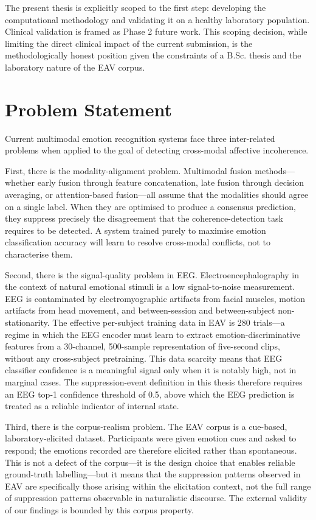 The present thesis is explicitly scoped to the first step: developing the computational methodology and validating it on a healthy laboratory population. Clinical validation is framed as Phase 2 future work. This scoping decision, while limiting the direct clinical impact of the current submission, is the methodologically honest position given the constraints of a B.Sc. thesis and the laboratory nature of the EAV corpus.

\section{Problem Statement}
Current multimodal emotion recognition systems face three inter-related problems when applied to the goal of detecting cross-modal affective incoherence.

First, there is the modality-alignment problem. Multimodal fusion methods---whether early fusion through feature concatenation, late fusion through decision averaging, or attention-based fusion---all assume that the modalities should agree on a single label. When they are optimised to produce a consensus prediction, they suppress precisely the disagreement that the coherence-detection task requires to be detected. A system trained purely to maximise emotion classification accuracy will learn to resolve cross-modal conflicts, not to characterise them.

Second, there is the signal-quality problem in EEG. Electroencephalography in the context of natural emotional stimuli is a low signal-to-noise measurement. EEG is contaminated by electromyographic artifacts from facial muscles, motion artifacts from head movement, and between-session and between-subject non-stationarity. The effective per-subject training data in EAV is 280 trials---a regime in which the EEG encoder must learn to extract emotion-discriminative features from a 30-channel, 500-sample representation of five-second clips, without any cross-subject pretraining. This data scarcity means that EEG classifier confidence is a meaningful signal only when it is notably high, not in marginal cases. The suppression-event definition in this thesis therefore requires an EEG top-1 confidence threshold of 0.5, above which the EEG prediction is treated as a reliable indicator of internal state.

Third, there is the corpus-realism problem. The EAV corpus is a cue-based, laboratory-elicited dataset. Participants were given emotion cues and asked to respond; the emotions recorded are therefore elicited rather than spontaneous. This is not a defect of the corpus---it is the design choice that enables reliable ground-truth labelling---but it means that the suppression patterns observed in EAV are specifically those arising within the elicitation context, not the full range of suppression patterns observable in naturalistic discourse. The external validity of our findings is bounded by this corpus property.

